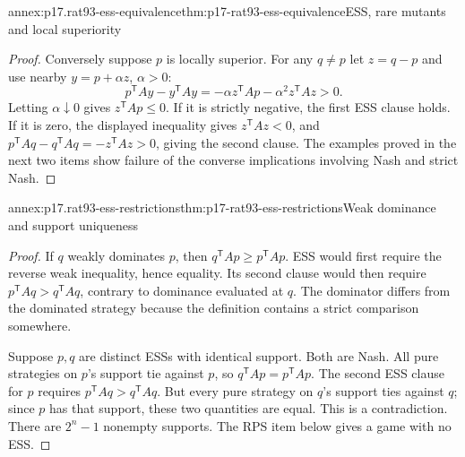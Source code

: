 \begin{annexitem}{annex:p17.rat93-ess-equivalence}{thm:p17-rat93-ess-equivalence}{ESS, rare mutants and local superiority}
\begin{proof}
Conversely suppose \(p\) is locally superior. For any \(q\ne p\)
let \(z=q-p\) and use nearby \(y=p+\alpha z\), \(\alpha>0\):
\[
 p^{\mathsf T}Ay-y^{\mathsf T}Ay
       =-\alpha z^{\mathsf T}Ap-\alpha^2z^{\mathsf T}Az>0.
\]
Letting \(\alpha\downarrow0\) gives \(z^{\mathsf T}Ap\leq0\).
If it is strictly negative, the first ESS clause holds. If it is
zero, the displayed inequality gives \(z^{\mathsf T}Az<0\), and
\(p^{\mathsf T}Aq-q^{\mathsf T}Aq=-z^{\mathsf T}Az>0\), giving
the second clause. The examples proved in the next two items show
failure of the converse implications involving Nash and strict Nash.
\end{proof}
\end{annexitem}

\begin{annexitem}{annex:p17.rat93-ess-restrictions}{thm:p17-rat93-ess-restrictions}{Weak dominance and support uniqueness}
\begin{proof}
If \(q\) weakly dominates \(p\), then
\(q^{\mathsf T}Ap\geq p^{\mathsf T}Ap\). ESS would first require
the reverse weak inequality, hence equality. Its second clause would
then require \(p^{\mathsf T}Aq>q^{\mathsf T}Aq\), contrary to
dominance evaluated at \(q\). The dominator differs from the dominated
strategy because the definition contains a strict comparison somewhere.

Suppose \(p,q\) are distinct ESSs with identical support. Both are
Nash. All pure strategies on \(p\)'s support tie against \(p\), so
\(q^{\mathsf T}Ap=p^{\mathsf T}Ap\). The second ESS clause for
\(p\) requires \(p^{\mathsf T}Aq>q^{\mathsf T}Aq\). But every
pure strategy on \(q\)'s support ties against \(q\); since
\(p\) has that support, these two quantities are equal. This is a
contradiction. There are \(2^n-1\) nonempty supports. The RPS item
below gives a game with no ESS.
\end{proof}
\end{annexitem}

